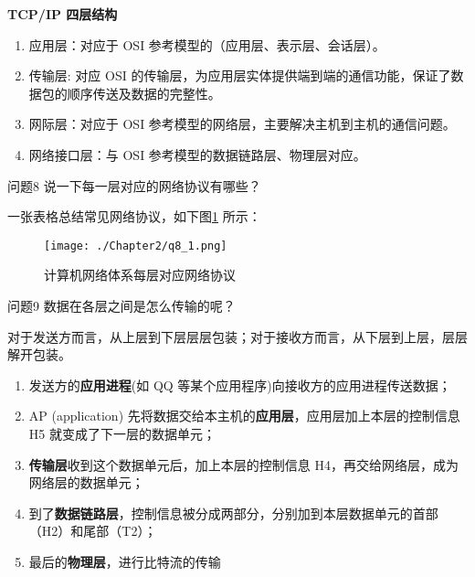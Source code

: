 \documentclass[cn,11pt,color=blue,lang=cn]{elegantbook}
\begin{document}
\begin{solution}
\begin{note} \textbf{TCP/IP 四层结构} \end{note}
\begin{enumerate}
\item 应用层：对应于 OSI 参考模型的（应用层、表示层、会话层）。
\item 传输层: 对应 OSI 的传输层，为应用层实体提供端到端的通信功能，保证了数据包的顺序传送及数据的完整性。
\item 网际层：对应于 OSI 参考模型的网络层，主要解决主机到主机的通信问题。
\item 网络接口层：与 OSI 参考模型的数据链路层、物理层对应。
\end{enumerate}
\end{solution}

\begin{custom}{问题8}
说一下每一层对应的网络协议有哪些？
\end{custom}
\begin{solution}
一张表格总结常见网络协议，如下图\ref{fig8_1} 所示：

\begin{figure}[htbp]
\centering
\texttt{[image: ./Chapter2/q8\_1.png]}
\caption{计算机网络体系每层对应网络协议}
\label{fig8_1}
\end{figure}
\end{solution}

\begin{custom}{问题9}
数据在各层之间是怎么传输的呢？
\end{custom}
\begin{solution}
对于发送方而言，从上层到下层层层包装；对于接收方而言，从下层到上层，层层解开包装。
\begin{enumerate}
\item 发送方的\textbf{应用进程}(如 QQ 等某个应用程序)向接收方的应用进程传送数据；
\item AP (application) 先将数据交给本主机的\textbf{应用层}，应用层加上本层的控制信息 H5 就变成了下一层的数据单元；
\item \textbf{传输层}收到这个数据单元后，加上本层的控制信息 H4，再交给网络层，成为网络层的数据单元；
\item 到了\textbf{数据链路层}，控制信息被分成两部分，分别加到本层数据单元的首部（H2）和尾部（T2）；
\item 最后的\textbf{物理层}，进行比特流的传输
\end{enumerate}
\end{solution}
\end{document}
